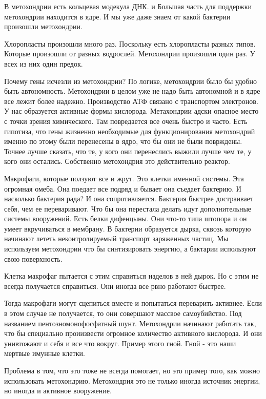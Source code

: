 В метохондрии есть кольцевая модекула ДНК. и Большая часть для поддержки 
метохондрии находится в ядре. И мы уже даже 
знаем от какой бактерии произошли метохондрии. 

Хлоропласты произошли много раз. Поскольку есть хлоропласты разных типов. 
Которые произошли от разных водрослей. Метохонлрии произошли один раз. У всех из 
них один предок. 

Почему гены исчезли из метохондрии? 
По логике, метохондрии было бы удобно быть автономность. Метохондрии 
в целом уже не надо быть автономной и в ядре все лежит более надежно. 
Производство АТФ связано с транспортом электронов. У нас 
образуется активные формы кислорода. Метахондрии
адски опасное место с точки зрения химического. Там 
повредается все очень быстро и часто. Есть гипотиза, что 
гены жизненно необходимые для функционирования метохондрий именно 
по этому были перенесены в ядро, что бы они не были 
поврждены. Точнее лучше сказать, что те, 
у кого они перенеслись выжили лучше чем те, 
у кого они остались. Собственно метохондрия это действительно 
реактор. 

Макрофаги, которые ползуют все и жрут. Это 
клетки именной системы. Эта огромная омеба. Она
поедает все подряд и бывает 
она съедает бактерию. И насколько бактерия рада? 
И она сопротивляется. Бактерия быстрее достраивает себя, 
чем ее переваривают. Что бы она перестала делать идут 
дополнительные системы вооружений. Есть белки 
дифенцыны. Они что-то типа штопора и он 
умеет вкручиваться в мембрану. В бактерии 
образуется дырка, 
сквозь которую начинают лететь неконтролируемый транспорт 
заряженных частиц. Мы используем метохондрии что бы синтизировать 
энергию, а бактарии используют свою поверхность. 

Клетка макрофаг пытается с этим справиться наделов в ней дырок. Но 
с этим не всегда получается справиться. Они иногда все рвно работают быстрее. 

Тогда макрофаги могут сцепиться вместе и попытаться переварить активнее. 
Если в этом случае не получается, то они совершают массвое самоубийство. 
Под  названием пентозномонофосфатный шунт. Метохондрии начинают работать 
так, что бы специально проиизвести огромное количество активного кислорода. 
И они унивтожают и себя и все что вокруг. Пример этого гной. Гной - это наши 
мертвые имунные клетки. 

Проблема в том, что это тоже не всегда помогает, но это 
пример того, как можно использовать метохондрию. Метохондрия 
это не только иногда источник энергии, но иногда и 
активное вооружение. 

